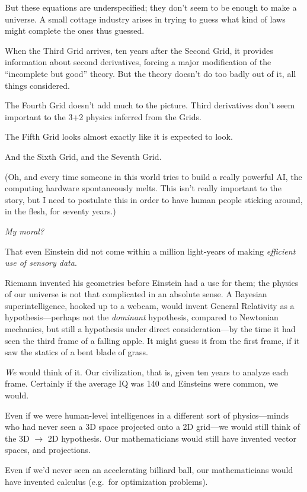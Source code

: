 {
 But these equations are underspecified; they don't
seem to be enough to make a universe. A small cottage industry arises
in trying to guess what kind of laws might complete the ones thus
guessed.}

{
 When the Third Grid arrives, ten years after the Second Grid, it
provides information about second derivatives, forcing a major
modification of the ``incomplete but
good'' theory. But the theory doesn't
do too badly out of it, all things considered.}

{
 The Fourth Grid doesn't add much to the picture.
Third derivatives don't seem important to the 3+2
physics inferred from the Grids.}

{
 The Fifth Grid looks almost exactly like it is expected to look.}

{
 And the Sixth Grid, and the Seventh Grid.}

{
 (Oh, and every time someone in this world tries to build a really
powerful AI, the computing hardware spontaneously melts. This
isn't really important to the story, but I need to
postulate this in order to have human people sticking around, in the
flesh, for seventy years.)}

{
 \textit{My moral?}}

{
 That even Einstein did not come within a million light-years of
making \textit{efficient use of sensory data}.}

{
 Riemann invented his geometries before Einstein had a use for
them; the physics of our universe is not that complicated in an
absolute sense. A Bayesian superintelligence, hooked up to a webcam,
would invent General Relativity as a hypothesis---perhaps not the
\textit{dominant} hypothesis, compared to Newtonian mechanics, but
still a hypothesis under direct consideration---by the time it had seen
the third frame of a falling apple. It might guess it from the first
frame, if it saw the statics of a bent blade of grass.}

{
 \textit{We} would think of it. Our civilization, that is, given
ten years to analyze each frame. Certainly if the average IQ was 140
and Einsteins were common, we would.}

{
 Even if we were human-level intelligences in a different sort of
physics---minds who had never seen a 3D space projected onto a 2D
grid---we would still think of the 3D $\rightarrow $ 2D hypothesis. Our
mathematicians would still have invented vector spaces, and
projections.}

{
 Even if we'd never seen an accelerating billiard
ball, our mathematicians would have invented calculus (e.g.~for
optimization problems).}

